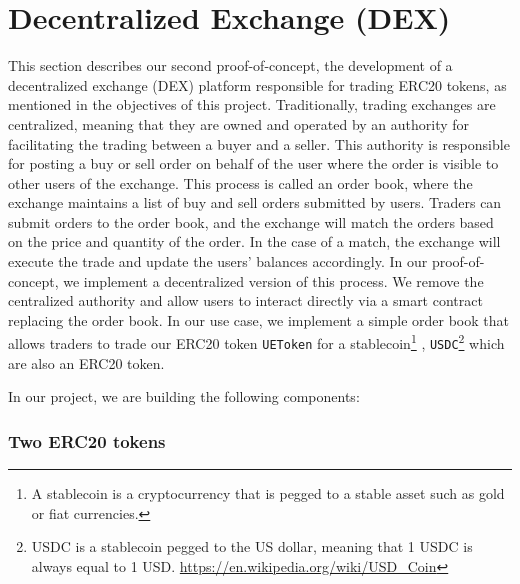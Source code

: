 

\section{Decentralized Exchange (DEX)}
\label{sec:dex}

This section describes our second proof-of-concept, the development of a decentralized exchange (DEX) platform responsible for trading ERC20 tokens,
as mentioned in the objectives of this project. Traditionally, trading exchanges are centralized, meaning that they are owned and operated by
an authority for facilitating the trading between a buyer and a seller. This authority is responsible for posting a buy or sell order on behalf
of the user where the order is visible to other users of the exchange. This process is called an order book, where the exchange maintains a list of buy and sell orders
submitted by users. Traders can submit orders to the order book, and the exchange will match the orders based on the price and quantity of the
order. In the case of a match, the exchange will execute the trade and update the users' balances accordingly. In our proof-of-concept, we
implement a decentralized version of this process. We remove the centralized authority and allow users to interact directly
via a smart contract replacing the order book. In our use case, we implement a simple order book that allows traders to trade our ERC20 token
\texttt{UEToken} for a stablecoin\footnote{A stablecoin is a cryptocurrency that is pegged to a stable asset such as gold or fiat currencies.}
, \texttt{USDC}\footnote{USDC is a stablecoin pegged to the US dollar, meaning that 1 USDC is always equal to 1 USD. \url{https://en.wikipedia.org/wiki/USD_Coin} }
which are also an ERC20 token.


In our project, we are building the following components:



\subsubsection{Two ERC20 tokens}


